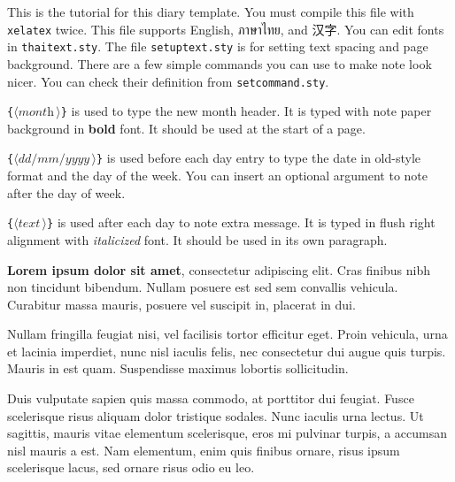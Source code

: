

This is the tutorial for this diary template.
You must compile this file with \texttt{xelatex} twice.
This file supports English, ภาษาไทย, and 汉字.
You can edit fonts in \texttt{thaitext.sty}.
The file \texttt{setuptext.sty} is for setting text spacing and page background.
There are a few simple commands you can use to make note look nicer.
You can check their definition from \texttt{setcommand.sty}.

\newcommand\Arg[1]{$\langle\textit{#1}\,\rangle$}

\texttt{\string\monthnote\{\Arg{month}\}} is used to type the new month header.
It is typed with note paper background in \textbf{bold} font.
It should be used at the start of a page.

\texttt{\string\daynote[\Arg{text}]\{\Arg{dd/mm/yyyy}\}} is used before each day entry to type the date in old-style format and the day of the week.
You can insert an optional argument to note after the day of week.

\texttt{\string\xdaynote\{\Arg{text}\}} is used after each day to note extra message.
It is typed in flush right alignment with \textit{italicized} font.
It should be used in its own paragraph.



\textbf{Lorem ipsum dolor sit amet}, consectetur adipiscing elit. Cras finibus nibh non tincidunt bibendum. Nullam posuere est sed sem convallis vehicula. Curabitur massa mauris, posuere vel suscipit in, placerat in dui.

Nullam fringilla feugiat nisi, vel facilisis tortor efficitur eget. Proin vehicula, urna et lacinia imperdiet, nunc nisl iaculis felis, nec consectetur dui augue quis turpis. Mauris in est quam. Suspendisse maximus lobortis sollicitudin.


Duis vulputate sapien quis massa commodo, at porttitor dui feugiat. Fusce scelerisque risus aliquam dolor tristique sodales. Nunc iaculis urna lectus. Ut sagittis, mauris vitae elementum scelerisque, eros mi pulvinar turpis, a accumsan nisl mauris a est. Nam elementum, enim quis finibus ornare, risus ipsum scelerisque lacus, sed ornare risus odio eu leo.

